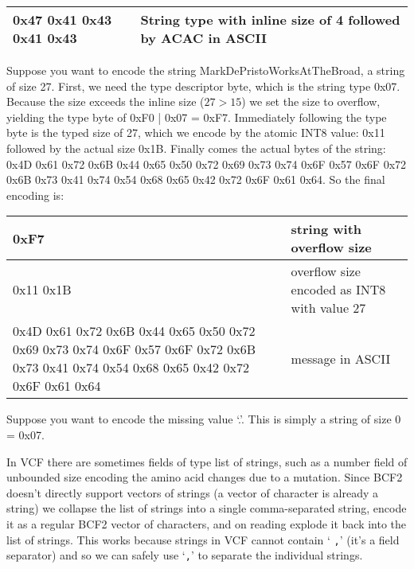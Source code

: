 \documentclass[8pt]{article}
\begin{document}
\vspace{0.1cm}
\begin{tabular}{| l | l |} \hline
0x47 0x41 0x43 0x41 0x43 & String type with inline size of 4 followed by ACAC in ASCII \\ \hline
\end{tabular}
\vspace{0.3cm}

Suppose you want to encode the string MarkDePristoWorksAtTheBroad, a string of size 27.  First, we need the type descriptor byte, which is the string type 0x07.  Because the size exceeds the inline size ($27 > 15$) we set the size to overflow, yielding the type byte of 0xF0 | 0x07 = 0xF7.  Immediately following the type byte is the typed size of 27, which we encode by the atomic INT8 value: 0x11 followed by the actual size 0x1B.  Finally comes the actual bytes of the string: 0x4D 0x61 0x72 0x6B 0x44 0x65 0x50 0x72 0x69 0x73 0x74 0x6F 0x57 0x6F 0x72 0x6B 0x73 0x41 0x74 0x54 0x68 0x65 0x42 0x72 0x6F 0x61 0x64.  So the final encoding is:

\vspace{0.3cm}
\begin{tabular}{ | p{9cm} | p{6cm} | } \hline
0xF7 & string with overflow size \\ \hline
0x11 0x1B & overflow size encoded as INT8 with value 27 \\ \hline
0x4D 0x61 0x72 0x6B 0x44 0x65 0x50 0x72 0x69 0x73 0x74 0x6F 0x57 0x6F 0x72 0x6B 0x73 0x41 0x74 0x54 0x68 0x65 0x42 0x72 0x6F 0x61 0x64 & message in ASCII \\ \hline
\end{tabular}
\vspace{0.3cm}

Suppose you want to encode the missing value `.'.  This is simply a string of size 0 = 0x07.

\vspace{0.3cm}
In VCF there are sometimes fields of type list of strings, such as a number
field of unbounded size encoding the amino acid changes due to a mutation.
Since BCF2 doesn't directly support vectors of strings (a vector of character
is already a string) we collapse the list of strings into a single
comma-separated string, encode it as a regular BCF2 vector of characters, and
on reading explode it back into the list of strings.  This works because
strings in VCF cannot contain `{ \tt ,}' (it's a field separator) and so we can
safely use `{\tt ,}' to separate the individual strings. 

%
%
\end{document}
